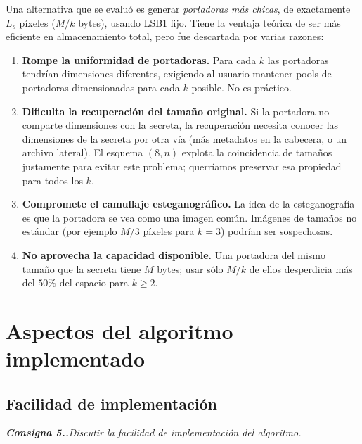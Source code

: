 \documentclass[11pt,a4paper]{article}
\newcommand{\pregunta}[1]{%
    \begingroup
    \itshape\small\color{gray!30!black}\textbf{Consigna 5.\arabic{section}.}\enspace #1\par\medskip
    \endgroup
}
\begin{document}
Una alternativa que se evaluó es generar \emph{portadoras más chicas},
de exactamente $L_s$ píxeles ($M/k$ bytes), usando LSB1 fijo. Tiene la
ventaja teórica de ser más eficiente en almacenamiento total, pero fue
descartada por varias razones:

\begin{enumerate}[leftmargin=*]
    \item \textbf{Rompe la uniformidad de portadoras.} Para cada $k$ las
          portadoras tendrían dimensiones diferentes, exigiendo al usuario
          mantener pools de portadoras dimensionadas para cada $k$
          posible. No es práctico.

    \item \textbf{Dificulta la recuperación del tamaño original.} Si la
          portadora no comparte dimensiones con la secreta, la recuperación
          necesita conocer las dimensiones de la secreta por otra vía
          (más metadatos en la cabecera, o un archivo lateral). El esquema
          $(8,n)$ explota la coincidencia de tamaños justamente para
          evitar este problema; querríamos preservar esa propiedad para
          todos los $k$.

    \item \textbf{Compromete el camuflaje esteganográfico.} La idea
          de la esteganografía es que la portadora se vea como una imagen
          común. Imágenes de tamaños no estándar (por ejemplo
          $M/3$ píxeles para $k=3$) podrían ser sospechosas.

    \item \textbf{No aprovecha la capacidad disponible.} Una portadora del
          mismo tamaño que la secreta tiene $M$ bytes; usar sólo $M/k$ de
          ellos desperdicia más del $50\%$ del espacio para $k \geq 2$.
\end{enumerate}

\section{Aspectos del algoritmo implementado}\label{sec:aspectos}

\subsection{Facilidad de implementación}
\pregunta{Discutir la facilidad de implementación del algoritmo.}
\end{document}
